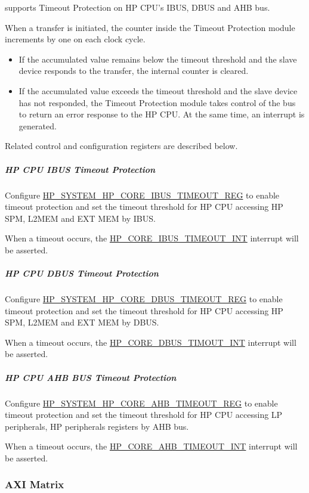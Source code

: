 \documentclass[main\_\_EN.tex]{subfiles}
\begin{document}
\chipname{} supports Timeout Protection on HP CPU's IBUS, DBUS and AHB bus.

When a transfer is initiated, the counter inside the Timeout Protection module increments by one on each clock cycle.

\begin{itemize}
    \item If the accumulated value remains below the timeout threshold and the slave device responds to the transfer, the internal counter is cleared.
    \item If the accumulated value exceeds the timeout threshold and the slave device has not responded, the Timeout Protection module takes control of the bus to return an error response to the HP CPU. At the same time, an interrupt is generated.
\end{itemize}

Related control and configuration registers are described below.


\subparagraph{HP CPU IBUS Timeout Protection}

Configure \hyperref[regdesc:HPSYSTEMHPCOREIBUSTIMEOUTREG]{HP\_SYSTEM\_HP\_CORE\_IBUS\_TIMEOUT\_REG} to enable timeout protection and set the timeout threshold for HP CPU accessing HP SPM, L2MEM and EXT MEM by IBUS.

When a timeout occurs, the \hyperref[tab:sysreg-int-sources]{HP\_CORE\_IBUS\_TIMEOUT\_INT} interrupt will be asserted.


\subparagraph{HP CPU DBUS Timeout Protection}

Configure \hyperref[regdesc:HPSYSTEMHPCOREDBUSTIMEOUTREG]{HP\_SYSTEM\_HP\_CORE\_DBUS\_TIMEOUT\_REG} to enable timeout protection and set the timeout threshold for HP CPU accessing HP SPM, L2MEM and EXT MEM by DBUS.

When a timeout occurs, the \hyperref[tab:sysreg-int-sources]{HP\_CORE\_DBUS\_TIMOUT\_INT} interrupt will be asserted.

\subparagraph{HP CPU AHB BUS Timeout Protection}

Configure \hyperref[regdesc:HPSYSTEMHPCOREAHBTIMEOUTREG]{HP\_SYSTEM\_HP\_CORE\_AHB\_TIMEOUT\_REG} to enable timeout protection and set the timeout threshold for HP CPU accessing LP peripherals, HP peripherals registers by AHB bus.

When a timeout occurs, the \hyperref[tab:sysreg-int-sources]{HP\_CORE\_AHB\_TIMEOUT\_INT} interrupt will be asserted.

\subsubsection{AXI Matrix}
\end{document}

